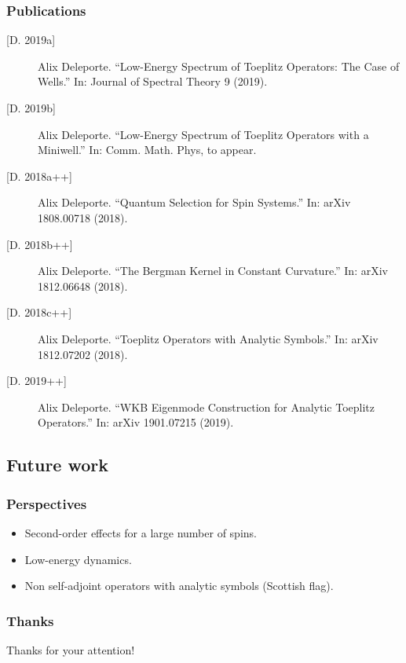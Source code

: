 \documentclass[mathserif]{beamer}
\begin{document}
     \begin{frame}
        \frametitle{Publications}
        {\footnotesize
        \begin{description}
        \item[{[D. 2019a]}] Alix Deleporte. “Low-Energy Spectrum of Toeplitz Operators: The Case
of Wells.” In: Journal of Spectral Theory 9 (2019).
\item[{[D. 2019b]}] Alix Deleporte. “Low-Energy Spectrum of Toeplitz Operators with a
Miniwell.” In: Comm. Math. Phys, to appear.
\item[{[D. 2018a++]}] Alix Deleporte. “Quantum Selection for Spin Systems.” In: arXiv
1808.00718 (2018).
\item[{[D. 2018b++]}] Alix Deleporte. “The Bergman Kernel in Constant Curvature.” In:
arXiv 1812.06648 (2018).
\item[{[D. 2018c++]}] Alix Deleporte. “Toeplitz Operators with Analytic Symbols.” In: arXiv
1812.07202 (2018).
\item[{[D. 2019++]}] Alix Deleporte. “WKB Eigenmode Construction for Analytic Toeplitz
  Operators.” In: arXiv 1901.07215 (2019).
        \end{description}}
      \end{frame}

\subsection{Future work}
\begin{frame}
  \frametitle{Perspectives}
    \begin{itemize}
    \item Second-order effects for a large number of spins.
    \item Low-energy dynamics.
    \item Non self-adjoint operators with analytic symbols (Scottish flag).
    \end{itemize}
  \end{frame}

  \begin{frame}
    \frametitle{Thanks}
    \centering 
    {\Large Thanks for your attention!}
  \end{frame}
  
\end{document}
